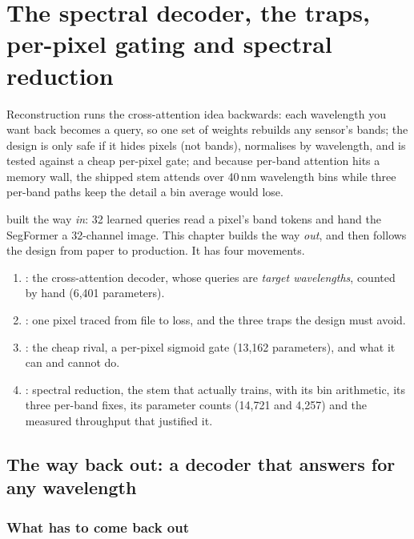\chapter{The spectral decoder, the traps, per-pixel gating and spectral reduction}\label{ch:specdecoder}

\begin{onething}
Reconstruction runs the cross-attention idea backwards: each wavelength you want back becomes a query, so one set of weights rebuilds any sensor's bands; the design is only safe if it hides pixels (not bands), normalises by wavelength, and is tested against a cheap per-pixel gate; and because per-band attention hits a memory wall, the shipped stem attends over 40\,nm wavelength bins while three per-band paths keep the detail a bin average would lose.
\end{onething}

 built the way \emph{in}: 32 learned queries read a pixel's band tokens and hand the SegFormer a 32-channel image. This chapter builds the way \emph{out}, and then follows the design from paper to production. It has four movements.

\begin{enumerate}
\item {}: the cross-attention decoder, whose queries are \emph{target wavelengths}, counted by hand (6,401 parameters).
\item {}: one pixel traced from file to loss, and the three traps the design must avoid.
\item {}: the cheap rival, a per-pixel sigmoid gate (13,162 parameters), and what it can and cannot do.
\item {}: spectral reduction, the stem that actually trains, with its bin arithmetic, its three per-band fixes, its parameter counts (14,721 and 4,257) and the measured throughput that justified it.
\end{enumerate}

\section{The way back out: a decoder that answers for any wavelength}\label{sec:specdecoder:decoder}

\subsection{What has to come back out}

